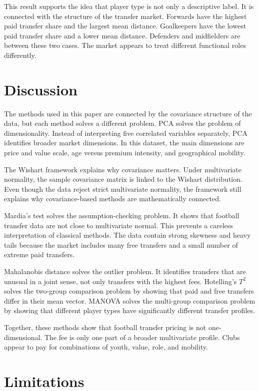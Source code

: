 \documentclass[12pt]{article}
\begin{document}
This result supports the idea that player type is not only a descriptive label. It is connected with the structure of the transfer market. Forwards have the highest paid transfer share and the largest mean distance. Goalkeepers have the lowest paid transfer share and a lower mean distance. Defenders and midfielders are between these two cases. The market appears to treat different functional roles differently.

\section{Discussion}

The methods used in this paper are connected by the covariance structure of the data, but each method solves a different problem. PCA solves the problem of dimensionality. Instead of interpreting five correlated variables separately, PCA identifies broader market dimensions. In this dataset, the main dimensions are price and value scale, age versus premium intensity, and geographical mobility.

The Wishart framework explains why covariance matters. Under multivariate normality, the sample covariance matrix is linked to the Wishart distribution. Even though the data reject strict multivariate normality, the framework still explains why covariance-based methods are mathematically connected.

Mardia's test solves the assumption-checking problem. It shows that football transfer data are not close to multivariate normal. This prevents a careless interpretation of classical methods. The data contain strong skewness and heavy tails because the market includes many free transfers and a small number of extreme paid transfers.

Mahalanobis distance solves the outlier problem. It identifies transfers that are unusual in a joint sense, not only transfers with the highest fees. Hotelling's $T^2$ solves the two-group comparison problem by showing that paid and free transfers differ in their mean vector. MANOVA solves the multi-group comparison problem by showing that different player types have significantly different transfer profiles.

Together, these methods show that football transfer pricing is not one-dimensional. The fee is only one part of a broader multivariate profile. Clubs appear to pay for combinations of youth, value, role, and mobility.

\section{Limitations}
\end{document}
